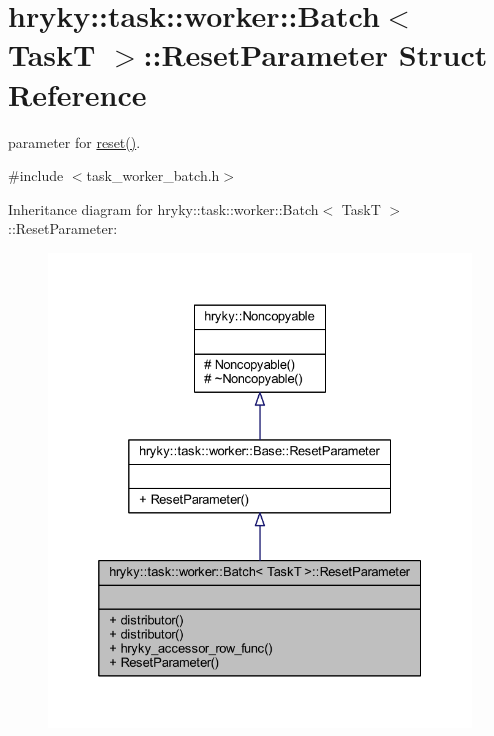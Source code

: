 \hypertarget{structhryky_1_1task_1_1worker_1_1_batch_1_1_reset_parameter}{\section{hryky\-:\-:task\-:\-:worker\-:\-:Batch$<$ Task\-T $>$\-:\-:Reset\-Parameter Struct Reference}
\label{structhryky_1_1task_1_1worker_1_1_batch_1_1_reset_parameter}
}


parameter for \hyperlink{group__task_ga88b1f6b27be23acb9fd42203d7cd3933}{reset()}.  




{\ttfamily \#include $<$task\-\_\-worker\-\_\-batch.\-h$>$}



Inheritance diagram for hryky\-:\-:task\-:\-:worker\-:\-:Batch$<$ Task\-T $>$\-:\-:Reset\-Parameter\-:\nopagebreak
\begin{figure}[H]
\begin{center}
\leavevmode
\includegraphics[width=332pt]{structhryky_1_1task_1_1worker_1_1_batch_1_1_reset_parameter__inherit__graph}
\end{center}
\end{figure}
